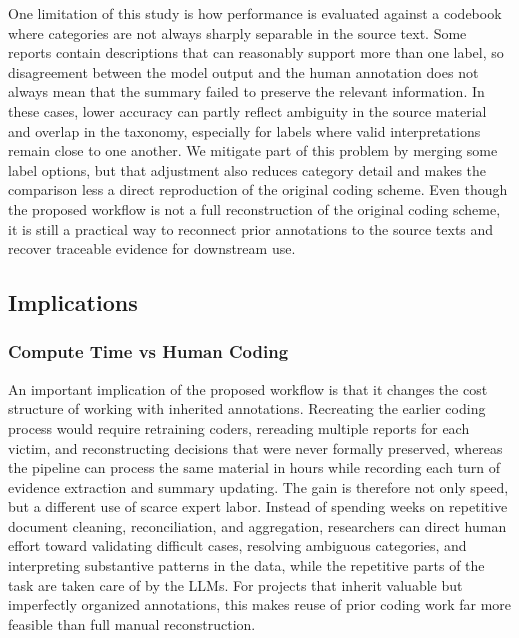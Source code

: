 \documentclass{article}
\begin{document}
One limitation of this study is how performance is evaluated against a codebook where categories are not always sharply separable in the source text. Some reports contain descriptions that can reasonably support more than one label, so disagreement between the model output and the human annotation does not always mean that the summary failed to preserve the relevant information. In these cases, lower accuracy can partly reflect ambiguity in the source material and overlap in the taxonomy, especially for labels where valid interpretations remain close to one another. We mitigate part of this problem by merging some label options, but that adjustment also reduces category detail and makes the comparison less a direct reproduction of the original coding scheme. Even though the proposed workflow is not a full reconstruction of the original coding scheme, it is still a practical way to reconnect prior annotations to the source texts and recover traceable evidence for downstream use.

\subsection{Implications}\label{implications}

\subsubsection{Compute Time vs Human
Coding}\label{compute-time-vs-human-coding}

An important implication of the proposed workflow is that it changes the cost structure of working with inherited annotations. Recreating the earlier coding process would require retraining coders, rereading multiple reports for each victim, and reconstructing decisions that were never formally preserved, whereas the pipeline can process the same material in hours while recording each turn of evidence extraction and summary updating. The gain is therefore not only speed, but a different use of scarce expert labor. Instead of spending weeks on repetitive document cleaning, reconciliation, and aggregation, researchers can direct human effort toward validating difficult cases, resolving ambiguous categories, and interpreting substantive patterns in the data, while the repetitive parts of the task are taken care of by the LLMs. For projects that inherit valuable but imperfectly organized annotations, this makes reuse of prior coding work far more feasible than full manual reconstruction.
\end{document}
